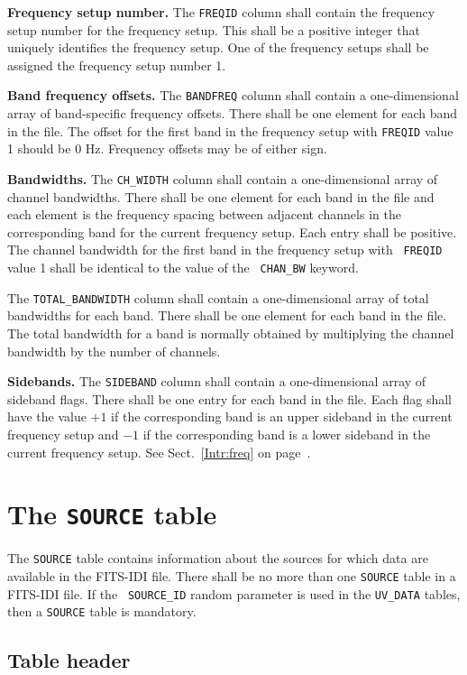 \documentclass[twoside]{article}
\newcommand{\Hi}[1]{\textcolor{hicol}{#1}}
\begin{document}
{\bf Frequency \Hi{setup} number.}  The {\tt FREQID} column shall
contain the frequency setup number for the frequency setup.  This
shall be a positive integer that uniquely identifies the frequency
setup.  One of the frequency setups shall be assigned the frequency
setup number 1.

{\bf Band frequency \Hi{offsets}.}  The {\tt BANDFREQ} column shall
contain a one-dimensional array of band-specific frequency offsets.
There shall be one element for each band in the file.  The offset for
the first band in the frequency setup with {\tt FREQID} \Hi{value} 1
should be 0 Hz.  \Hi{Frequency offsets may be of either sign.}

{\bf Bandwidths.} The {\tt CH\_WIDTH} column shall contain a
one-dimensional array of channel bandwidths.  There shall be one
element for each band in the file and each element is the frequency
spacing between adjacent channels in the corresponding band for the
current frequency \Hi{setup}.  Each entry shall be positive.  The
channel bandwidth for the first band in the frequency setup with {\tt
FREQID} \Hi{value} 1 shall be identical to the value of the {\tt
CHAN\_BW} keyword.

The {\tt TOTAL\_BANDWIDTH} column shall contain a one-dimensional array
of total bandwidths for each band.  There shall be one element for each
band in the file.  The total bandwidth for a band is normally obtained
by multiplying the channel bandwidth by the number of channels.

{\bf Sidebands.}  The {\tt SIDEBAND} column shall contain a
one-dimensional array of sideband flags.  There shall be one entry for
each band in the file.  Each flag shall have the value $+1$ if the
corresponding band is an upper sideband in the current frequency setup
and $-1$ if the corresponding band is a lower sideband in the current
frequency setup.  See Sect.~\ref{Intr:freq} on
page~\pageref{Intr:freq}.

\section{The {\tt SOURCE} table}
\label{s:SO}

The {\tt SOURCE} table contains information about the sources for
which data are available in the FITS-IDI file.  There shall be no more
than one {\tt SOURCE} table in a FITS-IDI file.  If the {\tt
  SOURCE\_ID} random parameter is used in the {\tt UV\_DATA} tables,
then a {\tt SOURCE} table is mandatory.

\subsection{Table header}
\end{document}
